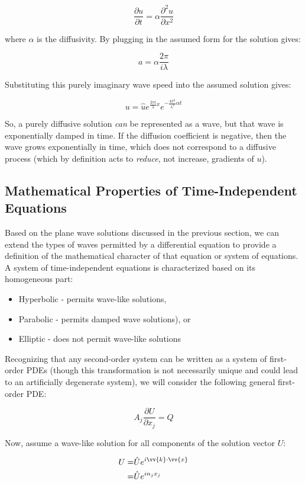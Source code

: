\documentclass[10pt]{article}
\newcommand{\beq}{\begin{equation}}
\newcommand{\eeq}{\end{equation}}
\newcommand{\beqa}{\begin{equation}\begin{aligned}}
\newcommand{\eeqa}{\end{aligned}\end{equation}}
\begin{document}
\begin{flushleft}
\beq
\frac{\partial u}{\partial t}=\alpha \frac{\partial^2u}{\partial x^2}
\eeq

where \(\alpha\) is the diffusivity. By plugging in the assumed form for the solution gives:

\beq
a=\alpha\frac{2\pi}{i\lambda}
\eeq

Substituting this purely imaginary wave speed into the assumed solution gives:

\beq
u=\hat{u}e^{\frac{2\pi i}{\lambda}x}e^{-\frac{4\pi^2}{\lambda^2}\alpha t}
\eeq

So, a purely diffusive solution {\it can} be represented as a wave, but that wave is exponentially damped in time. If the diffusion coefficient is negative, then the wave grows exponentially in time, which does not correspond to a diffusive process (which by definition acts to {\it reduce}, not increase, gradients of \(u\)). 

\subsection{Mathematical Properties of Time-Independent Equations}
Based on the plane wave solutions discussed in the previous section, we can extend the types of waves permitted by a differential equation to provide a definition of the mathematical character of that equation or system of equations. A system of time-independent equations is characterized based on its homogeneous part:

\begin{itemize}
\item Hyperbolic - permits wave-like solutions,
\item Parabolic - permits damped wave solutions), or
\item Elliptic - does not permit wave-like solutions
\end{itemize}

Recognizing that any second-order system can be written as a system of first-order PDEs (though this transformation is not necessarily unique and could lead to an artificially degenerate system), we will consider the following general first-order PDE:

\beq
\label{eq:SteadyStateEqn}
A_j\frac{\partial U}{\partial x_j}=Q
\eeq

Now, assume a wave-like solution for all components of the solution vector \(U\):

\beqa
\label{eq:WaveSolution}
U=&\hat{U}e^{i\vv{k}\cdot\vv{x}}\\
=&\hat{U}e^{in_jx_j}\\
\eeqa


\end{flushleft}
\end{document}
